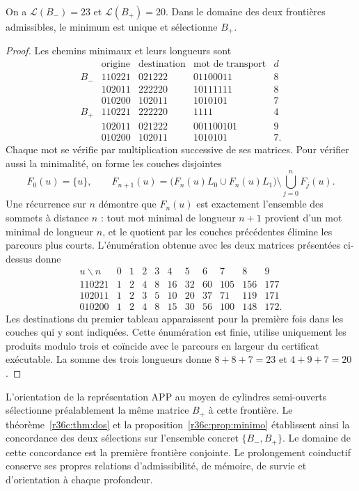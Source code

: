 \begin{proposition}
\label{r36c:prop:minimo} On a $\mathcal L(B_-)=23$ et $\mathcal L(B_+)=20$. Dans le domaine des deux frontières admissibles, le minimum est unique et sélectionne $B_+$.
\end{proposition}
\begin{proof}
Les chemins minimaux et leurs longueurs sont
\[
\begin{array}{c|c|c|c|c}
 &\text{origine}&\text{destination}&\text{mot de transport}&d\\\hline
B_-&110221&021222&01100011&8\\
 &102011&222220&10111111&8\\
 &010200&102011&1010101&7\\\hline
B_+&110221&222220&1111&4\\
 &102011&021222&001100101&9\\
 &010200&102011&1010101&7.
\end{array}
\]
Chaque mot se vérifie par multiplication successive de ses matrices. Pour vérifier aussi la minimalité, on forme les couches disjointes
\[
F_0(u)=\{u\},\qquad
F_{n+1}(u)=\bigl(F_n(u)L_0\cup F_n(u)L_1\bigr)
\setminus\bigcup_{j=0}^{n}F_j(u).
\]
Une récurrence sur $n$ démontre que $F_n(u)$ est exactement l’ensemble des sommets à distance $n$ : tout mot minimal de longueur $n+1$ provient d’un mot minimal de longueur $n$, et le quotient par les couches précédentes élimine les parcours plus courts. L’énumération obtenue avec les deux matrices présentées ci-dessus donne
\[
\begin{array}{c|rrrrrrrrrr}
u\backslash n&0&1&2&3&4&5&6&7&8&9\\\hline
110221&1&2&4&8&16&32&60&105&156&177\\
102011&1&2&3&5&10&20&37&71&119&171\\
010200&1&2&4&8&15&30&56&100&148&172.
\end{array}
\]
Les destinations du premier tableau apparaissent pour la première fois dans les couches qui y sont indiquées. Cette énumération est finie, utilise uniquement les produits modulo trois et coïncide avec le parcours en largeur du certificat exécutable. La somme des trois longueurs donne $8+8+7=23$ et $4+9+7=20$.
\end{proof}

L’orientation de la représentation APP au moyen de cylindres semi-ouverts sélectionne préalablement la même matrice $B_+$ à cette frontière. Le théorème~\ref{r36c:thm:dos} et la proposition~\ref{r36c:prop:minimo} établissent ainsi la concordance des deux sélections sur l’ensemble concret $\{B_-,B_+\}$. Le domaine de cette concordance est la première frontière conjointe. Le prolongement coinductif conserve ses propres relations d’admissibilité, de mémoire, de survie et d’orientation à chaque profondeur.

